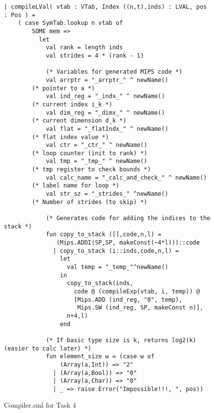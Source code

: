 \documentclass[12pt,a4paper,english]{article}
\begin{document}
\begin{figure}[h]
\begin{lstlisting}
| compileLVal( vtab : VTab, Index ((n,t),inds) : LVAL, pos : Pos ) =
    ( case SymTab.lookup n vtab of
        SOME mem => 
          let
            val rank = length inds
            val strides = 4 * (rank - 1)
                
            (* Variables for generated MIPS code *)
            val arrptr = "_arrptr_" ^ newName() 
		(* pointer to a *)
            val ind_reg = "_indx_" ^ newName() 
		(* current index i_k *)
            val dim_reg = "_dimx_" ^ newName() 
		(* current dimension d_k *)
            val flat = "_flatIndx_" ^ newName() 
		(* flat index value *)
            val ctr = "_ctr_" ^ newName() 
		(* loop counter (init to rank) *)
            val tmp = "_tmp_" ^ newName() 
		(* tmp register to check bounds *)
            val calc_name = "_calc_and_check_" ^ newName() 
		(* label name for loop *)
            val str_sz = "_strides_" ^newName() 
		(* Number of strides (to skip) *)

            (* Generates code for adding the indices to the stack *)
            fun copy_to_stack ([],code,n,l) = 
			   (Mips.ADDI(SP,SP, makeConst(~4*l)))::code 
              | copy_to_stack (i::inds,code,n,l) = 
                let 
                  val temp = "_temp_"^newName()
                in
                  copy_to_stack(inds, 
                    code @ (compileExp(vtab, i, temp)) @
                    [Mips.ADD (ind_reg, "0", temp),
                     Mips.SW (ind_reg, SP, makeConst n)], 
                  n+4,l)  
                end

            (* If basic type size is k, returns log2(k) (easier to calc later) *)
            fun element_size w = (case w of 
                (Array(a,Int)) => "2" 
              | (Array(a,Bool)) => "0" 
              | (Array(a,Char)) => "0"
              | _ => raise Error("Impossible!!!, ", pos))
\end{lstlisting}
\caption{Compiler.sml for Task 4}\end{figure}
\end{document}
